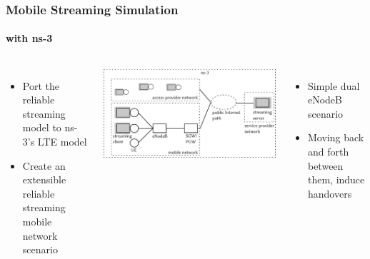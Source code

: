 \documentclass{beamer}
\begin{document}
\begin{frame}
	\frametitle{Mobile Streaming Simulation}
	\framesubtitle{with ns-3}

	\begin{columns}[T]


	\begin{itemize}
		\item Port the reliable streaming model to ns-3's LTE model
		\item Create an extensible reliable streaming mobile network scenario
	\end{itemize}

		\begin{center}
			\includegraphics[width=0.8\columnwidth]{extras/streaming-simulation.pdf}
		\end{center}


		\pause
		\begin{itemize}
			\item Simple dual eNodeB scenario
			\item Moving back and forth between them, induce handovers
		\end{itemize}


\end{columns}
\end{frame}
\end{document}
